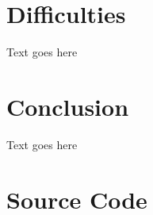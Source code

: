 \documentclass[12pt,letterpaper]{article}
\begin{document}
\section{Difficulties}
Text goes here

\section{Conclusion}
Text goes here

\section{Source Code}
	
\end{document}
